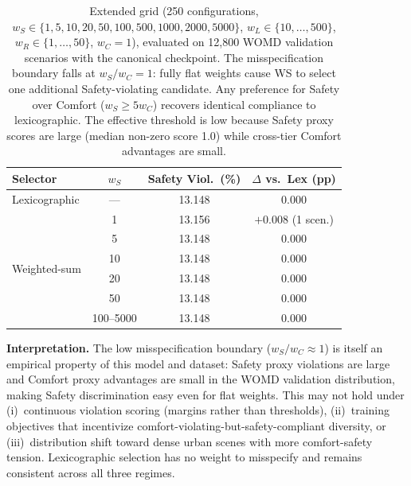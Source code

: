 \begin{table}[t]
\centering
\caption{Extended Weight Grid: Safety-Tier Violations vs.\ Lexicographic Baseline}
\label{tab:misspecification}
\setlength{\tabcolsep}{5pt}
\begin{tabular}{lccc}
\toprule
\textbf{Selector} & \textbf{$w_S$} & \textbf{Safety Viol.\ (\%)} & \textbf{$\Delta$ vs.\ Lex (pp)} \\
\midrule
Lexicographic  & ---  & 13.148 & 0.000 \\
\midrule
\multirow{6}{*}{Weighted-sum} & 1    & 13.156 & $+$0.008  (1 scen.) \\
                              & 5    & 13.148 & 0.000 \\
                              & 10   & 13.148 & 0.000 \\
                              & 20   & 13.148 & 0.000 \\
                              & 50   & 13.148 & 0.000 \\
                              & 100--5000 & 13.148 & 0.000 \\
\bottomrule
\end{tabular}
\vspace{1mm}
\caption*{\footnotesize Extended grid (250 configurations, $w_S \in \{1,5,10,20,50,100,500,1000,2000,5000\}$, $w_L \in \{10,\ldots,500\}$, $w_R \in \{1,\ldots,50\}$, $w_C{=}1$), evaluated on 12{,}800 WOMD validation scenarios with the canonical checkpoint.  The misspecification boundary falls at $w_S/w_C{=}1$: fully flat weights cause WS to select one additional Safety-violating candidate.  Any preference for Safety over Comfort ($w_S \geq 5 w_C$) recovers identical compliance to lexicographic.  The effective threshold is low because Safety proxy scores are large (median non-zero score 1.0) while cross-tier Comfort advantages are small.}
\end{table}

\noindent\textbf{Interpretation.}
The low misspecification boundary ($w_S/w_C \approx 1$) is itself an empirical property of this model and dataset: Safety proxy violations are large and Comfort proxy advantages are small in the WOMD validation distribution, making Safety discrimination easy even for flat weights.  This may not hold under (i)~continuous violation scoring (margins rather than thresholds), (ii)~training objectives that incentivize comfort-violating-but-safety-compliant diversity, or (iii)~distribution shift toward dense urban scenes with more comfort-safety tension.  Lexicographic selection has no weight to misspecify and remains consistent across all three regimes.

